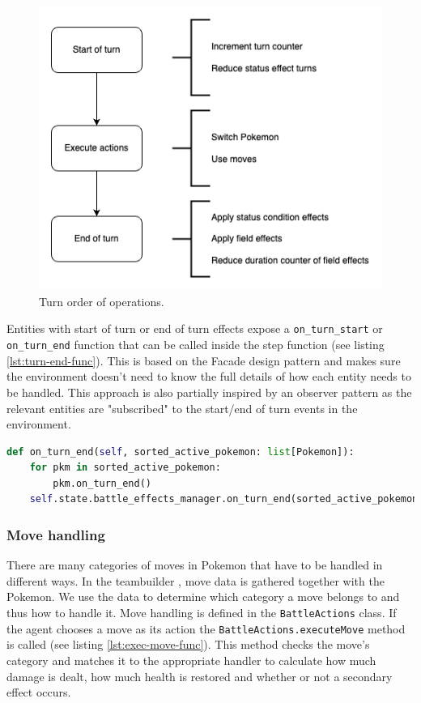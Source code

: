 \begin{figure}[H]
    \centering
    \includegraphics[width=.75\textwidth]{assets/turn-order-of-operations.png}
    \caption{Turn order of operations.}
    \label{fig:turn-order-of-operations}
\end{figure}

Entities with start of turn or end of turn effects expose a \lstinline|on_turn_start| or \lstinline|on_turn_end| function
that can be called inside the step function (see listing \ref{lst:turn-end-func}). This is based on
the Facade design pattern and makes sure the environment doesn't need to know the full details of how each entity needs
to be handled. This approach is also partially inspired by an observer pattern as the relevant entities are "subscribed"
to the start/end of turn events in the environment.
\begin{lstlisting}[language=Python,caption={Example of the environment handling the end of a turn without knowing each entity's full implementation.},float=h,label=lst:turn-end-func,breaklines]
def on_turn_end(self, sorted_active_pokemon: list[Pokemon]):
    for pkm in sorted_active_pokemon:
        pkm.on_turn_end()
    self.state.battle_effects_manager.on_turn_end(sorted_active_pokemon)
\end{lstlisting}

\subsubsection{Move handling}
There are many categories of moves in Pokemon that have to be handled in different ways. In the teambuilder \cite{TeambuilderCli},
move data is gathered together with the Pokemon. We use the data to determine which category a move belongs to and thus how
to handle it. Move handling is defined in the \lstinline|BattleActions| class. If the agent chooses a move as its action
the \lstinline|BattleActions.executeMove| method is called (see listing \ref{lst:exec-move-func}). This method checks the
move's category and matches it to the appropriate handler to calculate how much damage is dealt, how much health is restored
and whether or not a secondary effect occurs.

